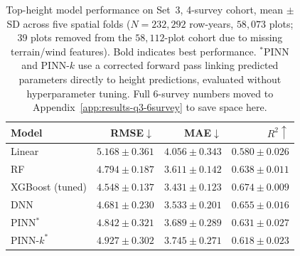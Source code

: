\begin{table}[!htbp]
\centering
\scriptsize
\setlength{\tabcolsep}{4pt}
\renewcommand{\arraystretch}{1.2}
\begin{tabular}{lrrr}
\toprule
Model & RMSE${\downarrow}$ & MAE${\downarrow}$ & $R^2{\uparrow}$ \\
\midrule
Linear & $5.168{\pm}0.361$ & $4.056{\pm}0.343$ & $0.580{\pm}0.026$ \\
RF & $4.794{\pm}0.187$ & $3.611{\pm}0.142$ & $0.638{\pm}0.011$ \\
XGBoost (tuned) & $\mathbf{4.548{\pm}0.137}$ & $\mathbf{3.431{\pm}0.123}$ & $\mathbf{0.674{\pm}0.009}$ \\
DNN & $4.681{\pm}0.230$ & $3.533{\pm}0.201$ & $0.655{\pm}0.016$ \\
PINN$^*$ & $4.842{\pm}0.321$ & $3.689{\pm}0.289$ & $0.631{\pm}0.027$ \\
PINN-$k^*$ & $4.927{\pm}0.302$ & $3.745{\pm}0.271$ & $0.618{\pm}0.023$ \\
\bottomrule
\end{tabular}
\caption{\footnotesize{Top-height model performance on Set~3, 4-survey cohort, mean $\pm$ SD
across five spatial folds ($N=232{,}292$ row-years, $58{,}073$ plots; 39 plots removed from the
$58{,}112$-plot cohort due to missing terrain/wind features). Bold indicates best performance.
$^*$PINN and PINN-$k$ use a corrected forward pass linking predicted parameters directly to
height predictions, evaluated without hyperparameter tuning. Full 6-survey numbers moved to
Appendix~\ref{app:results-q3-6survey} to save space here.}}
\label{tab:results-q3}
\end{table}

